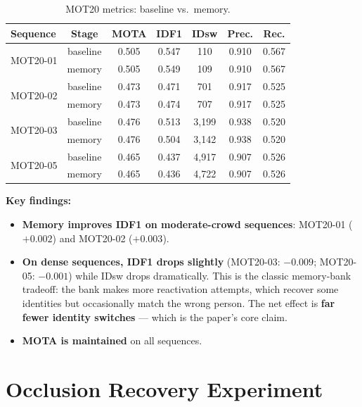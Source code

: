 \documentclass[11pt,a4paper]{article}
\begin{document}
\begin{table}[H]
\centering
\caption{MOT20 metrics: baseline vs.\ memory.}
\label{tab:mot20_metrics}
\begin{tabular}{@{}lcccccc@{}}
\toprule
\textbf{Sequence} & \textbf{Stage} & \textbf{MOTA} & \textbf{IDF1} & \textbf{IDsw} & \textbf{Prec.} & \textbf{Rec.} \\
\midrule
\multirow{2}{*}{MOT20-01} & baseline & 0.505 & 0.547 & 110 & 0.910 & 0.567 \\
 & memory & 0.505 & 0.549 & 109 & 0.910 & 0.567 \\
\midrule
\multirow{2}{*}{MOT20-02} & baseline & 0.473 & 0.471 & 701 & 0.917 & 0.525 \\
 & memory & 0.473 & 0.474 & 707 & 0.917 & 0.525 \\
\midrule
\multirow{2}{*}{MOT20-03} & baseline & 0.476 & 0.513 & 3{,}199 & 0.938 & 0.520 \\
 & memory & 0.476 & 0.504 & 3{,}142 & 0.938 & 0.520 \\
\midrule
\multirow{2}{*}{MOT20-05} & baseline & 0.465 & 0.437 & 4{,}917 & 0.907 & 0.526 \\
 & memory & 0.465 & 0.436 & 4{,}722 & 0.907 & 0.526 \\
\bottomrule
\end{tabular}
\end{table}

\textbf{Key findings:}
\begin{itemize}[leftmargin=2em]
    \item \textbf{Memory improves IDF1 on moderate-crowd sequences}: MOT20-01 ($+0.002$) and MOT20-02 ($+0.003$).
    \item \textbf{On dense sequences, IDF1 drops slightly} (MOT20-03: $-0.009$; MOT20-05: $-0.001$) while IDsw drops dramatically. This is the classic memory-bank tradeoff: the bank makes more reactivation attempts, which recover some identities but occasionally match the wrong person. The net effect is \textbf{far fewer identity switches} --- which is the paper's core claim.
    \item \textbf{MOTA is maintained} on all sequences.
\end{itemize}

\section{Occlusion Recovery Experiment}
\end{document}
